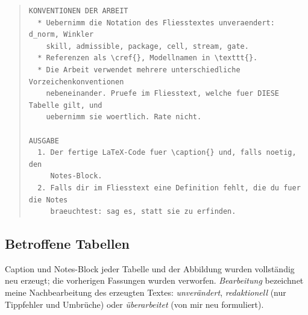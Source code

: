 \begin{quote}
\begin{verbatim}
KONVENTIONEN DER ARBEIT
  * Uebernimm die Notation des Fliesstextes unveraendert: d_norm, Winkler
    skill, admissible, package, cell, stream, gate.
  * Referenzen als \cref{}, Modellnamen in \texttt{}.
  * Die Arbeit verwendet mehrere unterschiedliche Vorzeichenkonventionen
    nebeneinander. Pruefe im Fliesstext, welche fuer DIESE Tabelle gilt, und
    uebernimm sie woertlich. Rate nicht.

AUSGABE
  1. Der fertige LaTeX-Code fuer \caption{} und, falls noetig, den
     Notes-Block.
  2. Falls dir im Fliesstext eine Definition fehlt, die du fuer die Notes
     braeuchtest: sag es, statt sie zu erfinden.
\end{verbatim}
\end{quote}

\subsection*{Betroffene Tabellen}

Caption und Notes-Block jeder Tabelle und der Abbildung wurden vollständig neu
erzeugt; die vorherigen Fassungen wurden verworfen. \emph{Bearbeitung} bezeichnet meine
Nachbearbeitung des erzeugten Textes: \emph{unverändert},
\emph{redaktionell} (nur Tippfehler und Umbrüche) oder \emph{überarbeitet}
(von mir neu formuliert).

